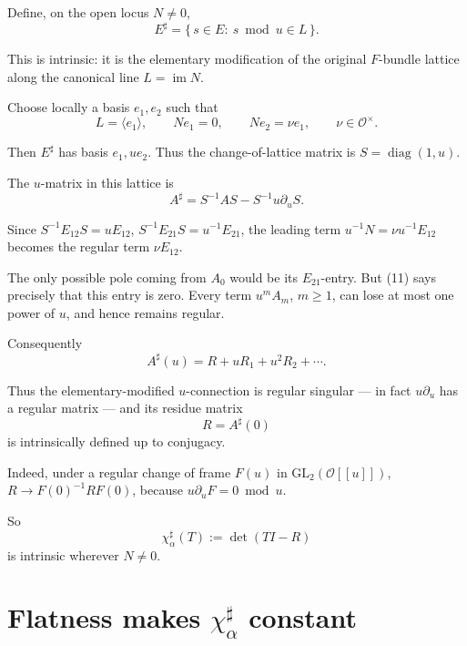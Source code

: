\documentclass[11pt]{article}
\theoremstyle{definition}
\theoremstyle{remark}
\begin{document}
Define, on the open locus $N\ne0$,
\begin{equation}
  E^\sharp=\{\,s\in E:\ s\bmod u\in L\,\}.
  \tag{12}
\end{equation}

This is intrinsic: it is the elementary modification of the original $F$-bundle
lattice along the canonical line $L=\operatorname{im}N$.

Choose locally a basis $e_1,e_2$ such that
\begin{equation}
  L=\langle e_1\rangle,\qquad Ne_1=0,\qquad Ne_2=\nu e_1,\qquad
  \nu\in\mathcal O^\times.
  \tag{13}
\end{equation}

Then $E^\sharp$ has basis $e_1,ue_2$. Thus the change-of-lattice matrix is
$S=\operatorname{diag}(1,u)$.

The $u$-matrix in this lattice is
\begin{equation}
  A^\sharp=S^{-1}AS-S^{-1}u\partial_uS.
  \tag{14}
\end{equation}

Since $S^{-1}E_{12}S=uE_{12}$, $S^{-1}E_{21}S=u^{-1}E_{21}$, the leading term
$u^{-1}N=\nu u^{-1}E_{12}$ becomes the regular term $\nu E_{12}$.

The only possible pole coming from $A_0$ would be its $E_{21}$-entry. But (11)
says precisely that this entry is zero. Every term $u^mA_m$, $m\ge1$, can lose
at most one power of $u$, and hence remains regular.

Consequently
\begin{equation}
  A^\sharp(u)=R+uR_1+u^2R_2+\cdots.
  \tag{15}
\end{equation}

Thus the elementary-modified $u$-connection is regular singular --- in fact
$u\partial_u$ has a regular matrix --- and its residue matrix
\begin{equation}
  R=A^\sharp(0)
  \tag{16}
\end{equation}
is intrinsically defined up to conjugacy.

Indeed, under a regular change of frame $F(u)$ in $\mathrm{GL}_2(\mathcal
O[[u]])$, $R\to F(0)^{-1}RF(0)$, because $u\partial_uF=0\bmod u$.

So
\begin{equation}
  \chi^\sharp_\alpha(T):=\det(TI-R)
  \tag{17}
\end{equation}
is intrinsic wherever $N\ne0$.

\section{Flatness makes $\chi^\sharp_\alpha$ constant}
\end{document}
